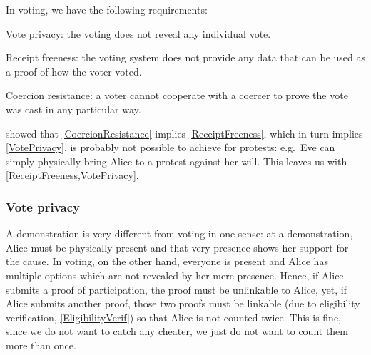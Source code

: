 In voting, we have the following requirements:
\begin{frame}
\begin{requirements}[P]
\item\label{VotePrivacy} Vote privacy: the voting does not reveal any 
  individual vote.
\item\label{ReceiptFreeness} Receipt freeness: the voting system does not 
  provide any data that can be used as a proof of how the voter voted.
\item\label{CoercionResistance} Coercion resistance: a voter cannot cooperate 
  with a coercer to prove the vote was cast in any particular way.
\end{requirements}
\pause{}
\end{frame}
\Textcite{VerifyingPrivacyPropertiesOfVotingProtocols} showed that 
\cref{CoercionResistance} implies \cref{ReceiptFreeness}, which in turn implies
\cref{VotePrivacy}.
 is probably not possible to achieve for protests:
e.g.\ Eve can simply physically bring Alice to a protest against her will.
This leaves us with \cref{ReceiptFreeness,VotePrivacy}.


\subsubsection{Vote privacy}

A demonstration is very different from voting in one sense: at a demonstration, 
Alice must be physically present and that very presence shows her support for 
the cause.
In voting, on the other hand, everyone is present and Alice has multiple 
options which are not revealed by her mere presence.
Hence, if Alice submits a proof of participation, the proof must be unlinkable 
to Alice, yet, if Alice submits another proof, those two proofs must be 
linkable (due to eligibility verification, \cref{EligibilityVerif}) so that 
Alice is not counted twice.
This is fine, since we do not want to catch any cheater, we just do not want to
count them more than once.


